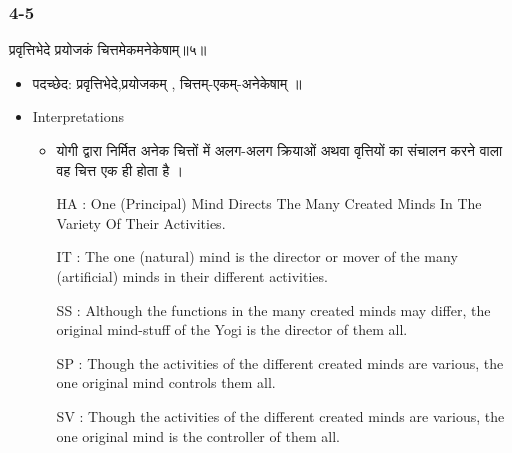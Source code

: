 \begin{frame}[fragile]\frametitle{4-5}
\begin{sanskrit}
प्रवृत्तिभेदे प्रयोजकं चित्तमेकमनेकेषाम्॥५॥
\end{sanskrit}

	\begin{itemize}
	\item पदच्छेद:  प्रवृत्तिभेदे,प्रयोजकम् , चित्तम्-एकम्-अनेकेषाम् ॥
	\item Interpretations
		\begin{itemize}	
		\item योगी द्वारा निर्मित अनेक चित्तों में अलग-अलग क्रियाओं अथवा वृत्तियों का संचालन करने वाला वह चित्त एक ही होता है ।
		\item [HA]: One (Principal) Mind Directs The Many Created Minds In The Variety Of Their Activities.
		\item [IT]: The one (natural) mind is the director or mover of the many (artificial) minds in their different activities.
		\item [SS]: Although the functions in the many created minds may differ, the original mind-stuff of the Yogi is the director of them all.
		\item [SP]: Though the activities of the different created minds are various, the one original mind controls them all.
		\item [SV]: Though the activities of the different created minds are various, the one original mind is the controller of them all. 
		\end{itemize}
	\end{itemize}
\end{frame}


